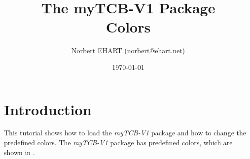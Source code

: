 \documentclass[]{myHOWTO-V001}
\title{The \textbf{myTCB-V1} Package\\{\small Colors}}
\author{Norbert EHART (norbert@ehart.net)}
\date{\today}
\begin{document}
	
%
%


%
%

\maketitle

%
%

\tableofcontents

%
%

\section{Introduction}

This tutorial shows how to load the \emph{myTCB-V1} package and how to change the predefined colors. The \emph{myTCB-V1} package has predefined colors, which are shown in .
\end{document}
